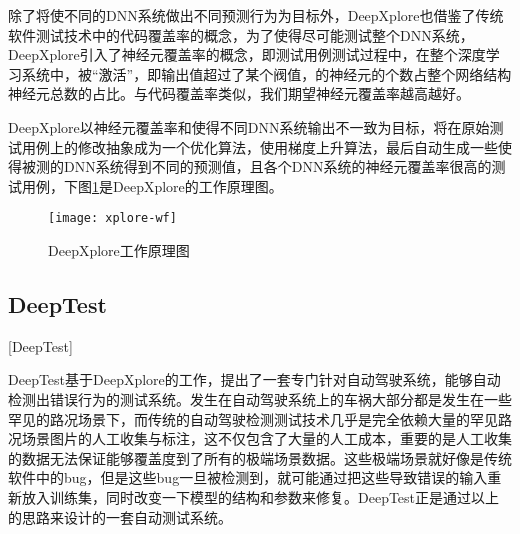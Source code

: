 除了将使不同的DNN系统做出不同预测行为为目标外，DeepXplore也借鉴了传统软件测试技术中的代码覆盖率的概念，为了使得尽可能测试整个DNN系统，DeepXplore引入了神经元覆盖率的概念，即测试用例测试过程中，在整个深度学习系统中，被“激活”，即输出值超过了某个阀值，的神经元的个数占整个网络结构神经元总数的占比。与代码覆盖率类似，我们期望神经元覆盖率越高越好。

DeepXplore以神经元覆盖率和使得不同DNN系统输出不一致为目标，将在原始测试用例上的修改抽象成为一个优化算法，使用梯度上升算法，最后自动生成一些使得被测的DNN系统得到不同的预测值，且各个DNN系统的神经元覆盖率很高的测试用例，下图\ref{xplore-wf}是DeepXplore的工作原理图。

\begin{figure}[h]
    \centering
    \texttt{[image: xplore-wf]}
    \caption{DeepXplore工作原理图\cite[图~5]{DeepXplore}}
    \label{xplore-wf}
\end{figure}

\subsection{DeepTest}[DeepTest]

DeepTest基于DeepXplore的工作，提出了一套专门针对自动驾驶系统，能够自动检测出错误行为的测试系统。发生在自动驾驶系统上的车祸大部分都是发生在一些罕见的路况场景下，而传统的自动驾驶检测测试技术几乎是完全依赖大量的罕见路况场景图片的人工收集与标注，这不仅包含了大量的人工成本，重要的是人工收集的数据无法保证能够覆盖度到了所有的极端场景数据。这些极端场景就好像是传统软件中的bug，但是这些bug一旦被检测到，就可能通过把这些导致错误的输入重新放入训练集，同时改变一下模型的结构和参数来修复。DeepTest正是通过以上的思路来设计的一套自动测试系统。